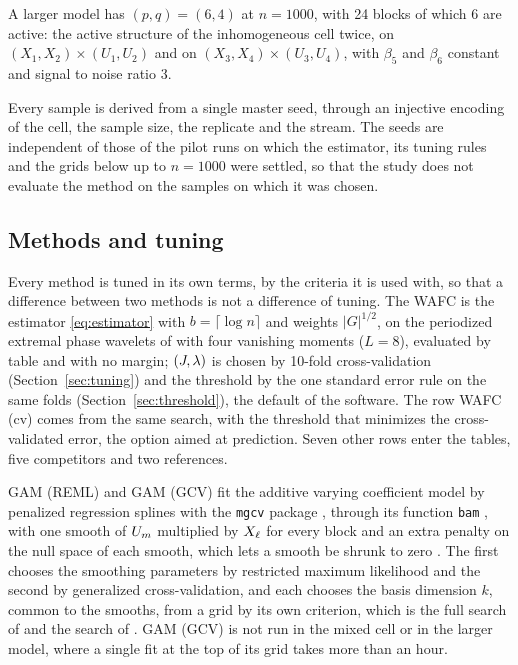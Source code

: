 A larger model has $(p,q) = (6,4)$ at $n = 1000$, with 24 blocks of which
6 are active: the active structure of the inhomogeneous cell twice, on
$(X_1,X_2)\times(U_1,U_2)$ and on $(X_3,X_4)\times(U_3,U_4)$, with $\beta_5$
and $\beta_6$ constant and signal to noise ratio 3.

Every sample is derived from a single master seed, through an injective
encoding of the cell, the sample size, the replicate and the stream. The seeds
are independent of those of the pilot runs on which the estimator, its tuning
rules and the grids below up to $n = 1000$ were settled, so that the study does not evaluate
the method on the samples on which it was chosen.

\subsection{Methods and tuning}
\label{sec:sim-methods}

Every method is tuned in its own terms, by the criteria it is used with, so
that a difference between two methods is not a difference of tuning. The WAFC
is the estimator \eqref{eq:estimator} with $b = \lceil\log n\rceil$ and
weights $|G|^{1/2}$, on the periodized extremal phase wavelets of
\citet{Daubechies-1992} with four vanishing moments ($L = 8$), evaluated by
table and with no margin; $(J,\lambda)$ is chosen by 10-fold cross-validation
(Section~\ref{sec:tuning}) and the threshold by the one standard error rule on
the same folds (Section~\ref{sec:threshold}), the default of the software. The
row WAFC (cv) comes from the same search, with the threshold that minimizes
the cross-validated error, the option aimed at prediction. Seven other rows
enter the tables, five competitors and two references.

GAM (REML) and GAM (GCV) fit the additive varying coefficient model by
penalized regression splines with the \texttt{mgcv} package
\citep{Wood-2017,Wood-mgcv-2025}, through its function \texttt{bam}
\citep{Wood-Goude-Shaw-2015}, with one smooth of $U_m$ multiplied by $X_\ell$
for every block and an extra penalty on the null space of each smooth, which
lets a smooth be shrunk to zero \citep{Marra-Wood-2011}. The first chooses the
smoothing parameters by restricted maximum likelihood and the second by
generalized cross-validation, and each chooses the basis dimension $k$, common
to the smooths, from a grid by its own criterion, which is the full search of
\citet{Ruppert-2002} and the search of \citet[Section~2.3]{Pya-Wood-2016}. GAM
(GCV) is not run in the mixed cell or in the larger model, where a single fit
at the top of its grid takes more than an hour.

